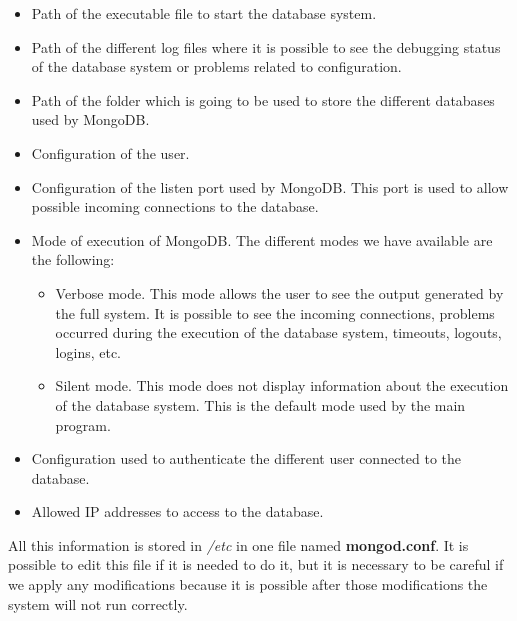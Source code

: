 \begin{itemize}

\item Path of the executable file to start the database system.

\item Path of the different log files where it is possible to see the debugging status of the database system or problems related to configuration.

\item Path of the folder which is going to be used to store the different databases used by MongoDB.

\item Configuration of the user.

\item Configuration of the listen port used by MongoDB. This port is used to allow possible incoming connections to the database.

\item Mode of execution of MongoDB. The different modes we have available are the following:

\begin{itemize}

\item Verbose mode. This mode allows the user to see the output generated by the full system. It is possible to see the incoming connections, problems occurred during the execution of the database system, timeouts, logouts, logins, etc.

\item Silent mode. This mode does not display information about the execution of the database system. This is the default mode used by the main program.

\end{itemize}

\item Configuration used to authenticate the different user connected to the database.

\item Allowed IP addresses to access to the database.

\end{itemize}

All this information is stored in \textit{/etc} in one file named \textbf{mongod.conf}. It is possible to edit this file if it is needed to do it, but it is necessary to be careful if we apply any modifications because it is possible after those modifications the system will not run correctly.\\

